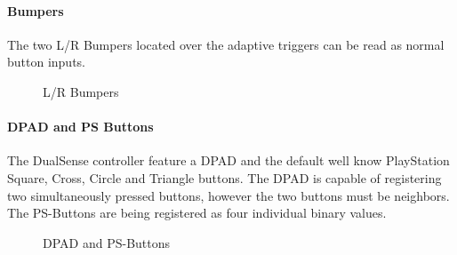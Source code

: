 \paragraph{Bumpers}
The two L/R Bumpers located over the adaptive triggers can be read as normal button inputs.
\begin{figure}[H]
    \centering
    \caption{L/R Bumpers}
\end{figure}

\paragraph{DPAD and PS Buttons}
The DualSense controller feature a DPAD and the default well know PlayStation Square, Cross, Circle and Triangle buttons. The DPAD is capable of registering two simultaneously pressed buttons, however the two buttons must be neighbors. The PS-Buttons are being registered as four individual binary values.
\begin{figure}[H]
    \centering
    \caption{DPAD and PS-Buttons}
\end{figure}


